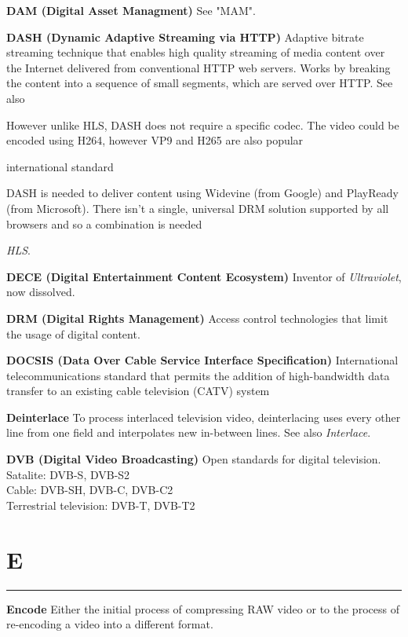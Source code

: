 \smallskip
\textbf{DAM (Digital Asset Managment)}
See "MAM".

\smallskip
\textbf{DASH (Dynamic Adaptive Streaming via HTTP)}
Adaptive bitrate streaming technique that enables high quality streaming of media content over the Internet delivered from conventional HTTP web servers. Works by breaking the content into a sequence of small segments, which are served over HTTP. See also

However unlike HLS, DASH does not require a specific codec. The video could be encoded using H264, however VP9 and H265 are also popular

international standard

DASH is needed to deliver content using Widevine (from Google) and PlayReady (from Microsoft). There isn’t a single, universal DRM solution supported by all browsers and so a combination is needed

\textit{HLS}.

\smallskip
\textbf{DECE (Digital Entertainment Content Ecosystem)}
Inventor of \textit{Ultraviolet}, now dissolved.

\smallskip
\textbf{DRM (Digital Rights Management)}
Access control technologies that limit the usage of digital content.

\smallskip
\textbf{DOCSIS (Data Over Cable Service Interface Specification)}
International telecommunications standard that permits the addition of high-bandwidth data transfer to an existing cable television (CATV) system

\smallskip
\textbf{Deinterlace}
To process interlaced television video, deinterlacing uses every other line from one field and interpolates new in-between lines. See also \textit{Interlace}.

\smallskip
\textbf{DVB (Digital Video Broadcasting)}
Open standards for digital television.\\
Satalite: DVB-S, DVB-S2\\
Cable: DVB-SH, DVB-C, DVB-C2\\
Terrestrial television: DVB-T, DVB-T2

\section{E}
\hrule

\smallskip
\textbf{Encode}
Either the initial process of compressing RAW video or to the process of re-encoding a video into a different format.

